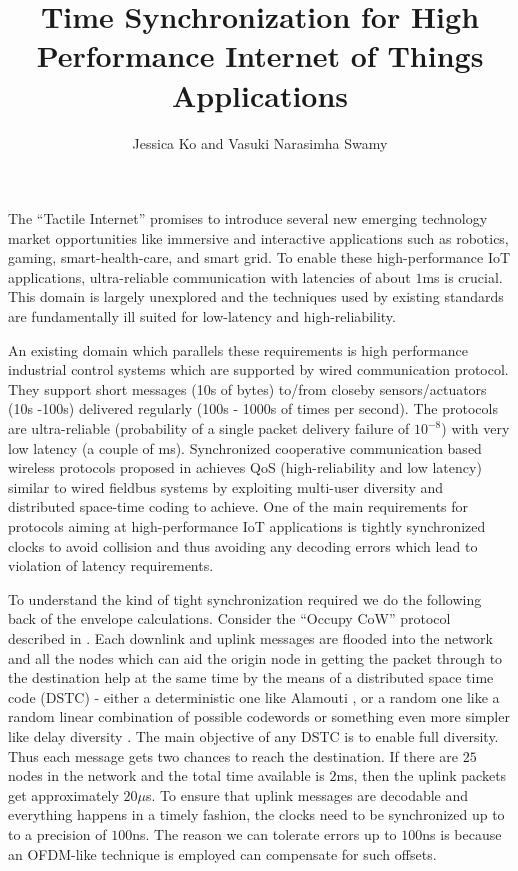 \documentclass[10pt, journal, letter, onecolumn]{IEEEtran}
\begin{document}
\title{Time Synchronization for High Performance Internet of Things Applications}

\author{
    Jessica Ko and Vasuki Narasimha Swamy
}
\maketitle
{}

The ``Tactile Internet'' promises to introduce several new emerging technology market opportunities like immersive and interactive applications such as robotics, gaming, smart-health-care, and smart grid.
To enable these high-performance IoT applications, ultra-reliable communication with latencies of about $1$ms is crucial.
This domain is largely unexplored and the techniques used by existing standards are fundamentally ill suited for low-latency and high-reliability.

An existing domain which parallels these requirements is high performance industrial control systems which are supported by wired communication protocol.
They support short messages (10s of bytes) to/from closeby sensors/actuators (10s -100s) delivered regularly (100s - 1000s of times per second). The protocols are ultra-reliable (probability of a single packet delivery failure of $10^{-8}$) with very low latency (a couple of ms).
Synchronized cooperative communication based wireless protocols proposed in \cite{swamy2015cooperative, swamy2016cooperative} achieves QoS (high-reliability and low latency) similar to wired fieldbus systems by exploiting multi-user diversity and distributed space-time coding to achieve.
One of the main requirements for protocols aiming at high-performance IoT applications is tightly synchronized clocks to avoid collision and thus avoiding any decoding errors which lead to violation of latency requirements.

To understand the kind of tight synchronization required we do the following back of the envelope calculations. Consider the ``Occupy CoW'' protocol described in \cite{swamy2015cooperative}. Each downlink and uplink messages are flooded into the network and all the nodes which can aid the origin node in getting the packet through to the destination help at the same time by the means of a distributed space time code (DSTC) - either a deterministic one like Alamouti \cite{alamouti1998simple}, or a random one like a random linear combination of possible codewords \cite{sirkeci2007randomized} or something even more simpler like delay diversity \cite{bossert2002cyclic}. The main objective of any DSTC is to enable full diversity. Thus each message gets two chances to reach the destination. If there are $25$ nodes in the network and the total time available is $2$ms, then the uplink packets get approximately $20 \mu$s. To ensure that uplink messages are decodable and everything happens in a timely fashion, the clocks need to be synchronized up to to a precision of $100$ns. The reason we can tolerate errors up to $100$ns is because an OFDM-like technique is employed can compensate for such offsets.
\end{document}
